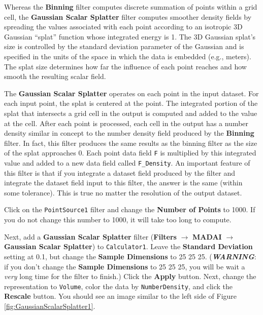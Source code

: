 \documentclass[12pt]{article}
\newcommand{\filter}[1]{\textbf{#1}}
\newcommand{\filterinstance}[1]{\texttt{#1}}
\newcommand{\menu}[1]{\textbf{#1}}
\newcommand{\representation}[1]{\texttt{#1}}
\newcommand{\setting}[1]{\textbf{#1}}
\newcommand{\field}[1]{\texttt{#1}}
\begin{document}
Whereas the \filter{Binning} filter computes discrete summation of points within a grid cell, the \filter{Gaussian Scalar Splatter} filter computes smoother density fields by spreading the values associated with each point according to an isotropic 3D Gaussian ``splat'' function whose integrated energy is 1. The 3D Gaussian splat's size is controlled by the standard deviation parameter of the Gaussian and is specified in the units of the space in which the data is embedded (e.g., meters). The splat size determines how far the influence of each point reaches and how smooth the resulting scalar field.

The \filter{Gaussian Scalar Splatter} operates on each point in the input dataset. For each input point, the splat is centered at the point. The integrated portion of the splat that intersects a grid cell in the output is computed and added to the value at the cell. After each point is processed, each cell in the output has a number density similar in concept to the number density field produced by the \filter{Binning} filter. In fact, this filter produces the same results as the binning filter as the size of the splat approaches 0. Each point data field \field{F} is multiplied by this integrated value and added to a new data field called \field{F\_Density}. An important feature of this filter is that if you integrate a dataset field produced by the filter and integrate the dataset field input to this filter, the answer is the same (within some tolerance). This is true no matter the resolution of the output dataset.

Click on the \filterinstance{PointSource1} filter and change the \setting{Number of Points} to 1000. If you do not change this number to 1000, it will take too long to compute.

Next, add a \filter{Gaussian Scalar Splatter} filter (\menu{Filters} $\rightarrow$ \menu{MADAI} $\rightarrow$ \menu{Gaussian Scalar Splatter}) to \filterinstance{Calculator1}. Leave the \textbf{Standard Deviation} setting at 0.1, but change the \textbf{Sample Dimensions} to 25 25 25. (\emph{\textbf{WARNING}}: if you don't change the \textbf{Sample Dimensions} to 25 25 25, you will be wait a \emph{very} long time for the filter to finish.) Click the \setting{Apply} button. Next, change the representation to \representation{Volume}, color the data by \field{NumberDensity}, and click the \setting{Rescale} button. You should see an image similar to the left side of Figure \ref{fig:GaussianScalarSplatter1}.
\end{document}
